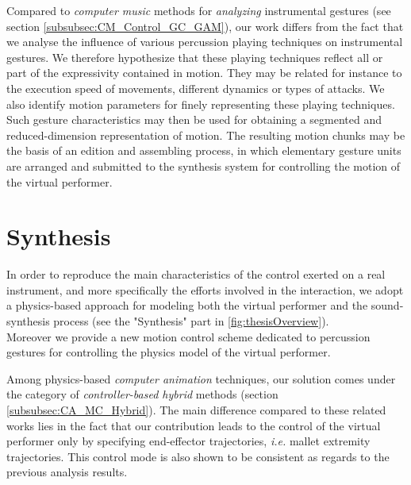Compared to \emph{computer music} methods for \emph{analyzing} instrumental gestures (see section \ref{subsubsec:CM_Control_GC_GAM}), our work differs from the fact that we analyse the influence of various percussion playing techniques on instrumental gestures. We therefore hypothesize that these playing techniques reflect all or part of the expressivity contained in motion. They may be related for instance to the execution speed of movements, different dynamics or types of attacks. We also identify motion parameters for finely representing these playing techniques.\\

Such gesture characteristics may then be used for obtaining a segmented and reduced-dimension representation of motion. The resulting motion chunks may be the basis of an edition and assembling process, in which elementary gesture units are arranged and submitted to the synthesis system for controlling the motion of the virtual performer.




	\section{Synthesis}
	
In order to reproduce the main characteristics of the control exerted on a real instrument, and more specifically the efforts involved in the interaction, we adopt a physics-based approach for modeling both the virtual performer and the sound-synthesis process (see the "Synthesis" part in \myfigname \ref{fig:thesisOverview}).\\

Moreover we provide a new motion control scheme dedicated to percussion gestures for controlling the physics model of the virtual performer.

Among physics-based \emph{computer animation} techniques, our solution comes under the category of \emph{controller-based hybrid} methods (section \ref{subsubsec:CA_MC_Hybrid}). The main difference compared to these related works lies in the fact that our contribution leads to the control of the virtual performer only by specifying end-effector trajectories, \emph{i.e.} mallet extremity trajectories. This control mode is also shown to be consistent as regards to the previous analysis results.


